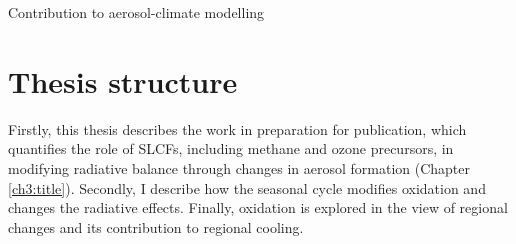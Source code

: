 Contribution to aerosol-climate modelling

\section{Thesis structure}


Firstly, this thesis describes the work in preparation for publication, which quantifies the role of SLCFs, including methane and ozone precursors, in modifying radiative balance through changes in aerosol formation (Chapter \ref{ch3:title}). Secondly, I describe how the seasonal cycle modifies  oxidation and changes the radiative effects. Finally, oxidation is explored in the view of regional changes and its contribution to regional cooling. 

